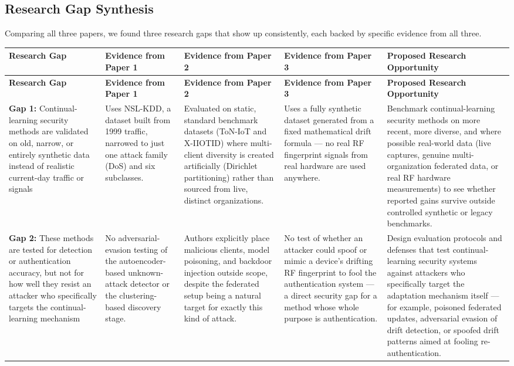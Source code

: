 \documentclass[10pt]{article}
\begin{document}
\clearpage
{}
\begin{landscape}
\section{Research Gap Synthesis}

Comparing all three papers, we found three research gaps that show up consistently, each backed by specific evidence from all three.

\begin{longtable}{
	L{3.2cm} L{4.2cm} L{4.2cm} L{4.2cm} L{4.6cm}
}
\toprule
{}
\textbf{Research Gap} & \textbf{Evidence from Paper 1} & \textbf{Evidence from Paper 2} & \textbf{Evidence from Paper 3} & \textbf{Proposed Research Opportunity} \\
\midrule
\endfirsthead
{}
\textbf{Research Gap} & \textbf{Evidence from Paper 1} & \textbf{Evidence from Paper 2} & \textbf{Evidence from Paper 3} & \textbf{Proposed Research Opportunity} \\
\midrule
\endhead
\midrule
\endfoot
\bottomrule
\endlastfoot

\textbf{Gap 1:} Continual-learning security methods are validated on old, narrow, or entirely synthetic data instead of realistic current-day traffic or signals &
Uses NSL-KDD, a dataset built from 1999 traffic, narrowed to just one attack family (DoS) and six subclasses. &
Evaluated on static, standard benchmark datasets (ToN-IoT and X-IIOTID) where multi-client diversity is created artificially (Dirichlet partitioning) rather than sourced from live, distinct organizations. &
Uses a fully synthetic dataset generated from a fixed mathematical drift formula --- no real RF fingerprint signals from real hardware are used anywhere. &
Benchmark continual-learning security methods on more recent, more diverse, and where possible real-world data (live captures, genuine multi-organization federated data, or real RF hardware measurements) to see whether reported gains survive outside controlled synthetic or legacy benchmarks. \\[6pt]

\textbf{Gap 2:} These methods are tested for detection or authentication accuracy, but not for how well they resist an attacker who specifically targets the continual-learning mechanism &
No adversarial-evasion testing of the autoencoder-based unknown-attack detector or the clustering-based discovery stage. &
Authors explicitly place malicious clients, model poisoning, and backdoor injection outside scope, despite the federated setup being a natural target for exactly this kind of attack. &
No test of whether an attacker could spoof or mimic a device's drifting RF fingerprint to fool the authentication system --- a direct security gap for a method whose whole purpose is authentication. &
Design evaluation protocols and defenses that test continual-learning security systems against attackers who specifically target the adaptation mechanism itself --- for example, poisoned federated updates, adversarial evasion of drift detection, or spoofed drift patterns aimed at fooling re-authentication. \\[6pt]


\end{longtable}
\end{landscape}
\end{document}
